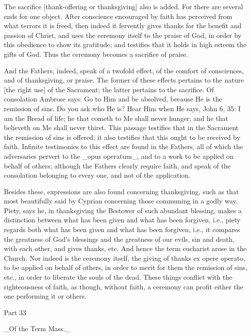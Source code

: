 The sacrifice [thank-offering or thanksgiving] also is added.  For
there are several ends for one object.  After conscience encouraged
by faith has perceived from what terrors it is freed, then indeed it
fervently gives thanks for the benefit and passion of Christ, and
uses the ceremony itself to the praise of God, in order by this
obedience to show its gratitude; and testifies that it holds in high
esteem the gifts of God.  Thus the ceremony becomes a sacrifice of
praise.

And the Fathers, indeed, speak of a twofold effect, of the comfort of
consciences, and of thanksgiving, or praise.  The former of these
effects pertains to the nature [the right use] of the Sacrament; the
latter pertains to the sacrifice.  Of consolation Ambrose says: Go to
Him and be absolved, because He is the remission of sins.  Do you ask
who He is?  Hear Him when He says, John 6, 35: I am the Bread of life;
he that cometh to Me shall never hunger; and he that believeth on Me
shall never thirst.  This passage testifies that in the Sacrament the
remission of sins is offered; it also testifies that this ought to be
received by faith.  Infinite testimonies to this effect are found in
the Fathers, all of which the adversaries pervert to the _opus
operatum_, and to a work to be applied on behalf of others; although
the Fathers clearly require faith, and speak of the consolation
belonging to every one, and not of the application.

Besides these, expressions are also found concerning thanksgiving,
such as that most beautifully said by Cyprian concerning those
communing in a godly way.  Piety, says he, in thanksgiving the
Bestower of such abundant blessing, makes a distinction between what
has been given and what has been forgiven, i.e., piety regards both
what has been given and what has been forgiven, i.e., it compares the
greatness of God's blessings and the greatness of our evils, sin and
death, with each other, and gives thanks, etc. And hence the term
eucharist arose in the Church.  Nor indeed is the ceremony itself,
the giving of thanks ex opere operato, to be applied on behalf of
others, in order to merit for them the remission of sins, etc., in
order to liberate the souls of the dead.  These things conflict with
the righteousness of faith, as though, without faith, a ceremony can
profit either the one performing it or others.




Part 33


_Of the Term Mass._

